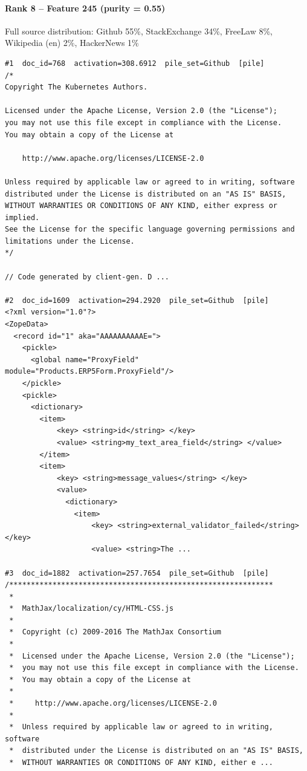 \paragraph*{Rank 8 -- Feature 245 (purity = 0.55)}

Full source distribution: Github 55\%, StackExchange 34\%, FreeLaw 8\%, Wikipedia (en) 2\%, HackerNews 1\%

\begin{verbatim}
#1  doc_id=768  activation=308.6912  pile_set=Github  [pile]
/*
Copyright The Kubernetes Authors.

Licensed under the Apache License, Version 2.0 (the "License");
you may not use this file except in compliance with the License.
You may obtain a copy of the License at

    http://www.apache.org/licenses/LICENSE-2.0

Unless required by applicable law or agreed to in writing, software
distributed under the License is distributed on an "AS IS" BASIS,
WITHOUT WARRANTIES OR CONDITIONS OF ANY KIND, either express or implied.
See the License for the specific language governing permissions and
limitations under the License.
*/

// Code generated by client-gen. D ...

#2  doc_id=1609  activation=294.2920  pile_set=Github  [pile]
<?xml version="1.0"?>
<ZopeData>
  <record id="1" aka="AAAAAAAAAAE=">
    <pickle>
      <global name="ProxyField" module="Products.ERP5Form.ProxyField"/>
    </pickle>
    <pickle>
      <dictionary>
        <item>
            <key> <string>id</string> </key>
            <value> <string>my_text_area_field</string> </value>
        </item>
        <item>
            <key> <string>message_values</string> </key>
            <value>
              <dictionary>
                <item>
                    <key> <string>external_validator_failed</string> </key>
                    <value> <string>The ...

#3  doc_id=1882  activation=257.7654  pile_set=Github  [pile]
/*************************************************************
 *
 *  MathJax/localization/cy/HTML-CSS.js
 *
 *  Copyright (c) 2009-2016 The MathJax Consortium
 *
 *  Licensed under the Apache License, Version 2.0 (the "License");
 *  you may not use this file except in compliance with the License.
 *  You may obtain a copy of the License at
 *
 *     http://www.apache.org/licenses/LICENSE-2.0
 *
 *  Unless required by applicable law or agreed to in writing, software
 *  distributed under the License is distributed on an "AS IS" BASIS,
 *  WITHOUT WARRANTIES OR CONDITIONS OF ANY KIND, either e ...


\end{verbatim}
